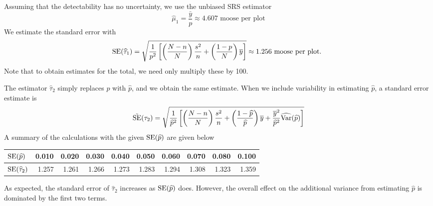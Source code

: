 \documentclass[usenames,dvipsnames]{homework}
\begin{document}

\begin{solution}
Assuming that the detectability has no uncertainty, we use the unbiased SRS estimator
$$
  \hat\mu_1 = \frac{\bar y}{p} \approx \text{4.607 moose per plot}
$$
We estimate the standard error with
$$
\mathrm{SE}(\widehat\tau_1) = \sqrt{\frac{1}{p^2} \left[
\left(\frac{N-n}{N}\right)\frac{s^2}{n} + \left(\frac{1-p}{N}\right)\overline y
\right]} \approx 1.256\text{ moose per plot. }
$$
Note that to obtain estimates for the total, we need only multiply these by 100.
\end{solution}


\begin{solution}
The estimator $\hat\tau_2$ simply replaces $p$ with $\hat p$, and we obtain the same estimate.  When we include variability in estimating $\hat p$, a standard error estimate is
$$
  \tilde{\mathrm{SE}}(\tau_2) = 
\sqrt{\frac{1}{\widehat p^2} \left[
\left(\frac{N-n}{N}\right)\frac{s^2}{n} + \left(\frac{1-\widehat p}{\widehat p}\right)\overline y
 + \frac{\overline y^2}{\widehat p^2} \widehat{\mathrm{Var}}(\widehat p)\right]}
$$
A summary of the calculations with the given $\mathrm{SE}(\widehat p)$ are given below
\begin{center}
  \renewcommand{\arraystretch}{1.4}
{
\begin{tabular}{l| r r r r r r r r r}
$\mathrm{SE}(\widehat p)$   &   0.010 & 0.020 & 0.030 & 0.040 & 0.050 & 0.060 & 0.070 & 0.080 & 0.100\\\hline
$\mathrm{SE}(\widehat\tau_2)$&  1.257 & 1.261 & 1.266 & 1.273 & 1.283 & 1.294 & 1.308 & 1.323 & 1.359\\
\end{tabular}
}
\end{center}
As expected, the standard error of $\hat\tau_2$ increases as $\mathrm{SE}(\widehat p)$ does.  However, the overall effect on the additional variance from estimating $\hat p$ is dominated by the first two terms. 

\end{solution}
\end{document}
